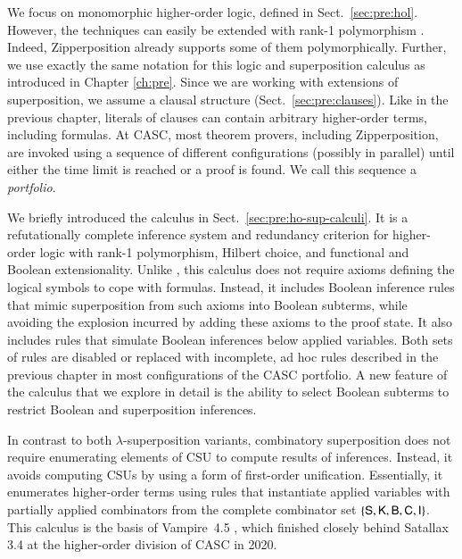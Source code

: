 We focus on monomorphic higher-order logic, defined in Sect.~\ref{sec:pre:hol}. However, the
techniques can easily be extended with rank-1 polymorphism \cite{ksr-16-th1}. Indeed, Zipperposition
already supports some of them polymorphically. Further, we use exactly the same
notation for this logic and superposition calculus as introduced in Chapter \ref{ch:pre}. Since we are
working with extensions of superposition, we assume a clausal structure
(Sect.~\ref{sec:pre:clauses}). Like in the previous chapter, literals
of clauses can contain arbitrary higher-order terms, including formulas.  
At CASC, most theorem provers, including Zipperposition, are invoked using a
sequence of different configurations (possibly in parallel) until either the
time limit is reached or a proof is found. We call this sequence a \emph{portfolio}.

We briefly introduced the \osup{} calculus \cite{bbtv-21-full-ho-sup} in
Sect.~\ref{sec:pre:ho-sup-calculi}. It is a refutationally complete inference
system and redundancy criterion for higher-order logic with rank-1 polymorphism,
Hilbert choice, and functional and Boolean extensionality.
Unlike \lsup{}, this calculus 
does not require axioms defining the logical symbols to cope with formulas.
Instead, it includes Boolean inference rules that mimic
superposition from such axioms into Boolean subterms,
while avoiding the explosion incurred by adding these axioms to the proof state. It
also includes rules that simulate Boolean inferences below applied variables.
Both sets of rules are disabled or replaced with incomplete, ad hoc rules
described in the previous chapter in most configurations
of the CASC portfolio.
A new feature of the calculus that we explore in detail is
the ability to select Boolean subterms
to restrict Boolean and superposition inferences.

In contrast to both $\lambda$-superposition variants, combinatory superposition
does not require enumerating elements of CSU to compute results of inferences.
Instead, it avoids computing CSUs by using a form of first-order unification.
Essentially, it enumerates higher-order terms using rules that instantiate
applied variables with partially applied combinators from the complete
combinator set $\{\mathsf{S}, \mathsf{K}, \mathsf{B}, \mathsf{C}, \mathsf{I}\}$. This calculus
is the basis of Vampire~4.5 \cite{br-20-full-sup-w-combs}, which finished
closely behind Satallax 3.4 %
at the higher-order division of CASC in 2020.

